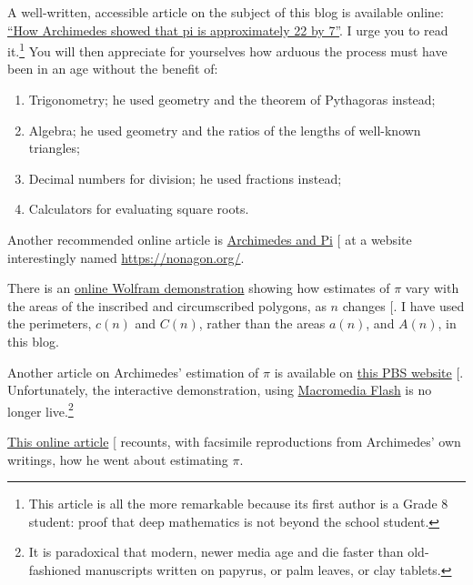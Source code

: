 \documentclass[
  a4paper,
]{article}
\begin{document}
A well-written, accessible article on the subject of this blog is
available online:
\href{https://publications.azimpremjiuniversity.edu.in/3356/1/02-DaminiAndAbhishek_PiIs22By7_Final.pdf}{``How
Archimedes showed that pi is approximately 22 by 7''}. I urge you to
read it.\footnote{This article is all the more remarkable because its
  first author is a Grade 8 student: proof that deep mathematics is not
  beyond the school student.} You will then appreciate for yourselves
how arduous the process must have been in an age without the benefit of:

\begin{enumerate}
\item
  Trigonometry; he used geometry and the theorem of Pythagoras instead;
\item
  Algebra; he used geometry and the ratios of the lengths of well-known
  triangles;
\item
  Decimal numbers for division; he used fractions instead;
\item
  Calculators for evaluating square roots.
\end{enumerate}

Another recommended online article is
\href{https://nonagon.org/ExLibris/archimedes-pi}{Archimedes and Pi}
{[}\citeproc{ref-bertrand2014}{2}{]} at a website interestingly named
\url{https://nonagon.org/}.

There is an
\href{https://demonstrations.wolfram.com/ArchimedesApproximationOfPi/\#more}{online
Wolfram demonstration} showing how estimates of \(\pi\) vary with the
areas of the inscribed and circumscribed polygons, as \(n\) changes
{[}\citeproc{ref-tucker2009}{11}{]}. I have used the perimeters,
\(c(n)\) and \(C(n)\), rather than the areas \(a(n)\), and \(A(n)\), in
this blog.

Another article on Archimedes' estimation of \(\pi\) is available on
\href{ttps://www.pbs.org/wgbh/nova/physics/approximating-pi.html}{this
PBS website} {[}\citeproc{ref-groleau2003}{12}{]}. Unfortunately, the
interactive demonstration, using
\href{https://en.wikipedia.org/wiki/Adobe_Flash}{Macromedia Flash} is no
longer live.\footnote{It is paradoxical that modern, newer media age and
  die faster than old-fashioned manuscripts written on papyrus, or palm
  leaves, or clay tablets.}

\href{https://mathsciencehistory.com/2019/10/01/archimedes-and-his-pi-the-great-numerical-hope/}{This
online article} {[}\citeproc{ref-birchak2019}{13}{]} recounts, with
facsimile reproductions from Archimedes' own writings, how he went about
estimating \(\pi\).
\end{document}
